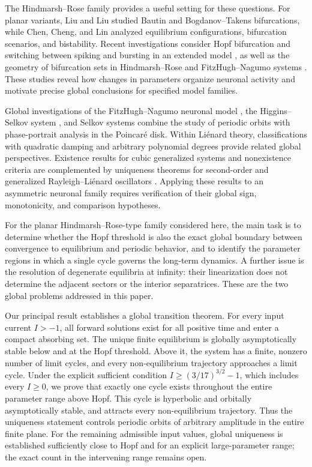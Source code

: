 \documentclass[11pt,reqno]{amsart}
\theoremstyle{plain}
\theoremstyle{definition}
\theoremstyle{remark}
\begin{document}
The Hindmarsh--Rose family provides a useful setting for these
questions. For planar variants, Liu and Liu
\cite{liu2012codimension} studied Bautin and Bogdanov--Takens
bifurcations, while Chen, Cheng, and Lin
\cite{chen2013application} analyzed equilibrium configurations,
bifurcation scenarios, and bistability. Recent investigations
consider Hopf bifurcation and switching between spiking and bursting
in an extended model \cite{yang2026bifurcations}, as well as the
geometry of bifurcation sets in Hindmarsh--Rose and FitzHugh--Nagumo
systems \cite{barrio2024exploring}. These studies reveal how changes
in parameters organize neuronal activity and motivate precise
global conclusions for specified model families.

Global investigations of the FitzHugh--Nagumo neuronal model
\cite{chen2026global}, the Higgins--Selkov system
\cite{llibre2022phase}, and Selkov systems
\cite{cao2025global} combine the study of periodic orbits with
phase-portrait analysis in the Poincar\'e disk. Within Li\'enard
theory, classifications with quadratic damping
\cite{guo2018global} and arbitrary polynomial degrees
\cite{chen2025global} provide related global perspectives.
Existence results for cubic generalized systems
\cite{zhao2025limit} and nonexistence criteria
\cite{chen2024new} are complemented by uniqueness theorems for
second-order \cite{chen2023uniqueness} and generalized
Rayleigh--Li\'enard oscillators
\cite{gebreselassie2024uniqueness}. Applying these results to an
asymmetric neuronal family requires verification of their global
sign, monotonicity, and comparison hypotheses.

For the planar Hindmarsh--Rose-type family considered
here, the main task is to determine whether the Hopf threshold is
also the exact global boundary between convergence to equilibrium
and periodic behavior, and to identify the parameter regions in
which a single cycle governs the long-term dynamics. A further
issue is the resolution of degenerate equilibria at infinity:
their linearization does not determine the adjacent sectors or
the interior separatrices. These are the two global problems
addressed in this paper.

Our principal result establishes a global transition theorem.
For every input current $I>-1$, all forward solutions exist for
all positive time and enter a compact absorbing set. The unique
finite equilibrium is globally asymptotically stable below and
at the Hopf threshold. Above it, the system has a finite,
nonzero number of limit cycles, and every non-equilibrium
trajectory approaches a limit cycle. Under the explicit sufficient
condition $I\geq(3/17)^{3/2}-1$, which includes every $I\geq0$,
we prove that exactly one cycle exists throughout the entire
parameter range above Hopf. This cycle is hyperbolic and orbitally
asymptotically stable, and attracts every non-equilibrium
trajectory. Thus the uniqueness statement controls periodic
orbits of arbitrary amplitude in the entire finite plane.
For the remaining admissible input values, global uniqueness is
established sufficiently close to Hopf and for an explicit
large-parameter range; the exact count in the intervening range
remains open.
\end{document}
